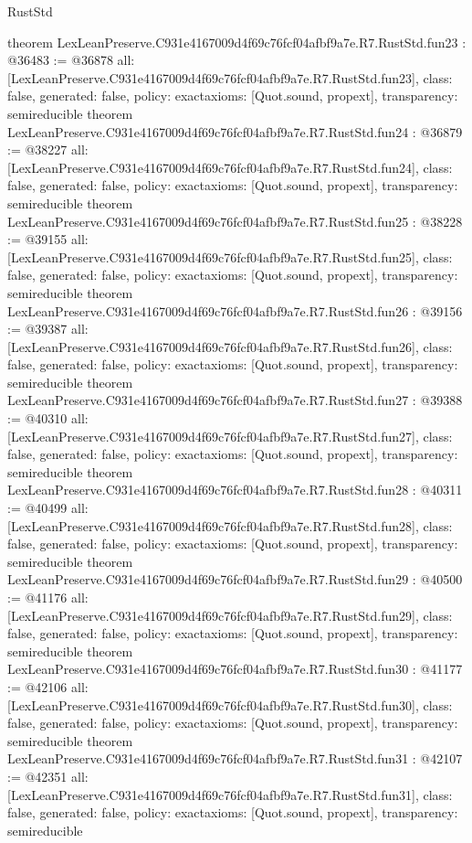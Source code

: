 \begin{lexlean}{RustStd}
\begin{coremodule}
{}
theorem LexLeanPreserve.C931e4167009d4f69c76fcf04afbf9a7e.R7.RustStd.fun23 : @36483 := @36878 {
  all: [LexLeanPreserve.C931e4167009d4f69c76fcf04afbf9a7e.R7.RustStd.fun23],
  class: false,
  generated: false,
  policy: exact{axioms: [Quot.sound, propext]},
  transparency: semireducible
}
theorem LexLeanPreserve.C931e4167009d4f69c76fcf04afbf9a7e.R7.RustStd.fun24 : @36879 := @38227 {
  all: [LexLeanPreserve.C931e4167009d4f69c76fcf04afbf9a7e.R7.RustStd.fun24],
  class: false,
  generated: false,
  policy: exact{axioms: [Quot.sound, propext]},
  transparency: semireducible
}
theorem LexLeanPreserve.C931e4167009d4f69c76fcf04afbf9a7e.R7.RustStd.fun25 : @38228 := @39155 {
  all: [LexLeanPreserve.C931e4167009d4f69c76fcf04afbf9a7e.R7.RustStd.fun25],
  class: false,
  generated: false,
  policy: exact{axioms: [Quot.sound, propext]},
  transparency: semireducible
}
theorem LexLeanPreserve.C931e4167009d4f69c76fcf04afbf9a7e.R7.RustStd.fun26 : @39156 := @39387 {
  all: [LexLeanPreserve.C931e4167009d4f69c76fcf04afbf9a7e.R7.RustStd.fun26],
  class: false,
  generated: false,
  policy: exact{axioms: [Quot.sound, propext]},
  transparency: semireducible
}
theorem LexLeanPreserve.C931e4167009d4f69c76fcf04afbf9a7e.R7.RustStd.fun27 : @39388 := @40310 {
  all: [LexLeanPreserve.C931e4167009d4f69c76fcf04afbf9a7e.R7.RustStd.fun27],
  class: false,
  generated: false,
  policy: exact{axioms: [Quot.sound, propext]},
  transparency: semireducible
}
theorem LexLeanPreserve.C931e4167009d4f69c76fcf04afbf9a7e.R7.RustStd.fun28 : @40311 := @40499 {
  all: [LexLeanPreserve.C931e4167009d4f69c76fcf04afbf9a7e.R7.RustStd.fun28],
  class: false,
  generated: false,
  policy: exact{axioms: [Quot.sound, propext]},
  transparency: semireducible
}
theorem LexLeanPreserve.C931e4167009d4f69c76fcf04afbf9a7e.R7.RustStd.fun29 : @40500 := @41176 {
  all: [LexLeanPreserve.C931e4167009d4f69c76fcf04afbf9a7e.R7.RustStd.fun29],
  class: false,
  generated: false,
  policy: exact{axioms: [Quot.sound, propext]},
  transparency: semireducible
}
theorem LexLeanPreserve.C931e4167009d4f69c76fcf04afbf9a7e.R7.RustStd.fun30 : @41177 := @42106 {
  all: [LexLeanPreserve.C931e4167009d4f69c76fcf04afbf9a7e.R7.RustStd.fun30],
  class: false,
  generated: false,
  policy: exact{axioms: [Quot.sound, propext]},
  transparency: semireducible
}
theorem LexLeanPreserve.C931e4167009d4f69c76fcf04afbf9a7e.R7.RustStd.fun31 : @42107 := @42351 {
  all: [LexLeanPreserve.C931e4167009d4f69c76fcf04afbf9a7e.R7.RustStd.fun31],
  class: false,
  generated: false,
  policy: exact{axioms: [Quot.sound, propext]},
  transparency: semireducible
}
\end{coremodule}
\end{lexlean}
